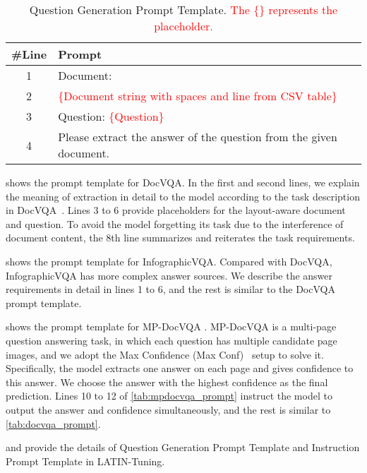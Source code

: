 \documentclass[letterpaper]{article} \usepackage{aaai24_preprint}  \usepackage{times}  \usepackage{helvet}  \usepackage{courier}  \usepackage[hyphens]{url}  \usepackage{graphicx} \urlstyle{rm} \def\UrlFont{\rm}  \usepackage{natbib}  \usepackage{caption} \frenchspacing  \setlength{\pdfpagewidth}{8.5in} \setlength{\pdfpageheight}{11in} \usepackage{algorithm}
\begin{document}
\begin{table*}[ht]
\small
\centering
\begin{tabular}{cl}
\toprule
\#Line& Prompt\\
\midrule
1& Document:\\
2& \textcolor{red}{\{Document string with spaces and line from CSV table\}}\\
3& Question: \textcolor{red}{\{Question\}}\\
4& Please extract the answer of the question from the given document.\\
\bottomrule
\end{tabular}
\caption{Question Generation Prompt Template. \textcolor{red}{The \{\} represents the placeholder.}
}
\label{tab:instruction_prompt}
\end{table*}

 shows the prompt template for DocVQA\cite{mathewDocVQA2021}.
In the first and second lines, we explain the meaning of extraction in detail to the model according to the task description in DocVQA~\cite{mathewDocVQA2021}.
Lines 3 to 6 provide placeholders for the layout-aware document and question.
To avoid the model forgetting its task due to the interference of document content, the 8th line summarizes and reiterates the task requirements.

 shows the prompt template for InfographicVQA\cite{mathewInfographicVQA2021}.
Compared with DocVQA, InfographicVQA has more complex answer sources.
We describe the answer requirements in detail in lines 1 to 6, and the rest is similar to the DocVQA prompt template.

 shows the prompt template for MP-DocVQA \cite{titoMulti-PageDocVQAHi-VT52023}.
MP-DocVQA is a multi-page question answering task, in which each question has multiple candidate page images, and we adopt the Max Confidence (Max Conf)~\cite{mathewDocVQA2021} setup to solve it.
Specifically, the model extracts one answer on each page and gives confidence to this answer.
We choose the answer with the highest confidence as the final prediction.
Lines 10 to 12 of \cref{tab:mpdocvqa_prompt} instruct the model to output the answer and confidence simultaneously, and the rest is similar to \cref{tab:docvqa_prompt}.

 and  provide the details of Question Generation Prompt Template and Instruction Prompt Template in LATIN-Tuning. 
\end{document}
